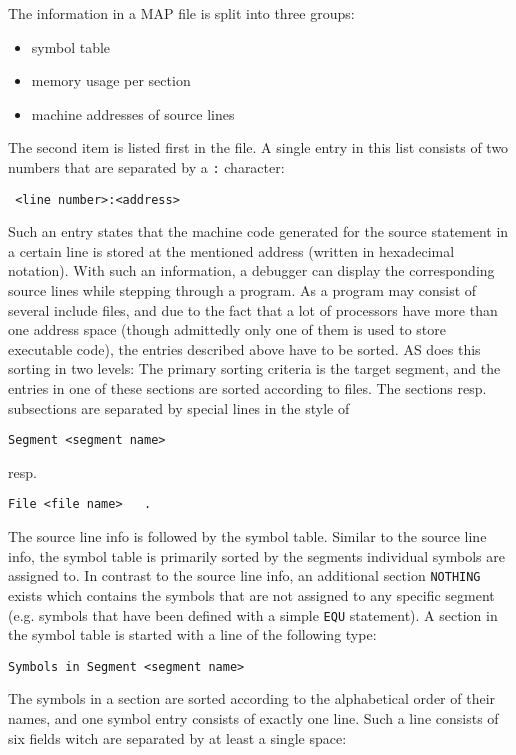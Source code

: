 \documentclass[12pt,twoside]{report}
\newcommand{\tty}[1]{{\tt #1}}
\begin{document}
The information in a MAP file is split into three groups:
\begin{itemize}
\item{symbol table}
\item{memory usage per section}
\item{machine addresses of source lines}
\end{itemize}
The second item is listed first in the file.  A single entry in this
list consists of two numbers that are separated by a \tty{:} character:
\begin{verbatim}
 <line number>:<address>
\end{verbatim}
Such an entry states that the machine code generated for the source
statement in a certain line is stored at the mentioned address
(written in hexadecimal notation).  With such an information, a
debugger can display the corresponding source lines while stepping
through a program.  As a program may consist of several include
files, and due to the fact that a lot of processors have more than
one address space (though admittedly only one of them is used to
store executable code), the entries described above have to be
sorted.  AS does this sorting in two levels: The primary sorting
criteria is the target segment, and the entries in one of these
sections are sorted according to files.  The sections resp.
subsections are separated by special lines in the style of
\begin{verbatim}
Segment <segment name>
\end{verbatim}
resp.
\begin{verbatim}
File <file name>   .
\end{verbatim}
The source line info is followed by the symbol table.  Similar to the
source line info, the symbol table is primarily sorted by the
segments individual symbols are assigned to.  In contrast to the
source line info, an additional section \tty{NOTHING} exists which contains
the symbols that are not assigned to any specific segment (e.g.
symbols that have been defined with a simple \tty{EQU} statement).  A
section in the symbol table is started with a line of the following
type:
\begin{verbatim}
Symbols in Segment <segment name>
\end{verbatim}
The symbols in a section are sorted according to the alphabetical
order of their names, and one symbol entry consists of exactly one
line.  Such a line consists of six fields witch are separated by at
least a single space:
\end{document}
